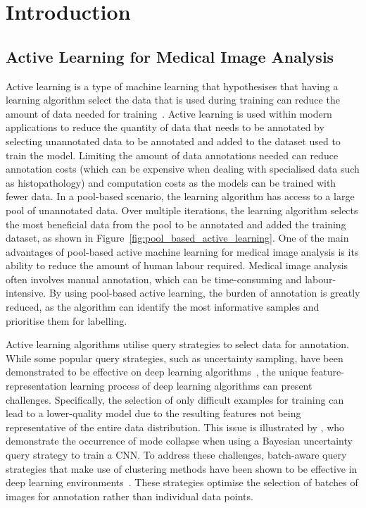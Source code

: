 \section{Introduction}
\label{sec:active_introduction}
\subsection{Active Learning for Medical Image Analysis}
\label{subsec:active_for_medical_image_analysis}
Active learning is a type of machine learning that hypothesises that having a learning algorithm select the data that is used during training can reduce the amount of data needed for training~\citep{settles2009active}. Active learning is used within modern applications to reduce the quantity of data that needs to be annotated by selecting unannotated data to be annotated and added to the dataset used to train the model. Limiting the amount of data annotations needed can reduce annotation costs (which can be expensive when dealing with specialised data such as histopathology) and computation costs as the models can be trained with fewer data. In a pool-based scenario, the learning algorithm has access to a large pool of unannotated data. Over multiple iterations, the learning algorithm selects the most beneficial data from the pool to be annotated and added the training dataset, as shown in Figure~\ref{fig:pool_based_active_learning}. One of the main advantages of pool-based active machine learning for medical image analysis is its ability to reduce the amount of human labour required. Medical image analysis often involves manual annotation, which can be time-consuming and labour-intensive. By using pool-based active learning, the burden of annotation is greatly reduced, as the algorithm can identify the most informative samples and prioritise them for labelling.

Active learning algorithms utilise query strategies to select data for annotation. While some popular query strategies, such as uncertainty sampling, have been demonstrated to be effective on deep learning algorithms~\citep{gal2017deep}, the unique feature-representation learning process of deep learning algorithms can present challenges. Specifically, the selection of only difficult examples for training can lead to a lower-quality model due to the resulting features not being representative of the entire data distribution. This issue is illustrated by \cite{pop2018deep}, who demonstrate the occurrence of mode collapse when using a Bayesian uncertainty query strategy to train a CNN. To address these challenges, batch-aware query strategies that make use of clustering methods have been shown to be effective in deep learning environments~\citep{sener2017active, zhdanov2019diverse, kirsch2019batchbald}. These strategies optimise the selection of batches of images for annotation rather than individual data points.

